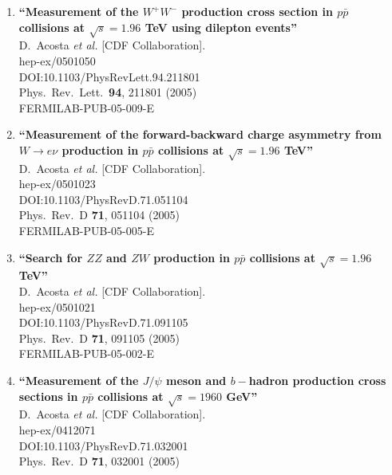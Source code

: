 \documentclass{article}
\begin{document}
\begin{enumerate}
\item%
{\bf ``Measurement of the $W^+ W^-$ production cross section in $p\bar{p}$ collisions at $\sqrt{s} = 1.96$ TeV using dilepton events''}
  \\{}D.~Acosta {\it et al.} [CDF Collaboration].
  \\{}hep-ex/0501050
  \\{}DOI:10.1103/PhysRevLett.94.211801
  \\{}Phys.\ Rev.\ Lett.\  {\bf 94}, 211801 (2005)
  \\{}FERMILAB-PUB-05-009-E
\item%
{\bf ``Measurement of the forward-backward charge asymmetry from $W \to e \nu$ production in $p\bar{p}$ collisions at $\sqrt{s} = 1.96$ TeV''}
  \\{}D.~Acosta {\it et al.} [CDF Collaboration].
  \\{}hep-ex/0501023
  \\{}DOI:10.1103/PhysRevD.71.051104
  \\{}Phys.\ Rev.\ D {\bf 71}, 051104 (2005)
  \\{}FERMILAB-PUB-05-005-E
\item%
{\bf ``Search for $Z Z$ and $Z W$ production in $p\bar{p}$ collisions at $\sqrt{s} = 1.96$ TeV''}
  \\{}D.~Acosta {\it et al.} [CDF Collaboration].
  \\{}hep-ex/0501021
  \\{}DOI:10.1103/PhysRevD.71.091105
  \\{}Phys.\ Rev.\ D {\bf 71}, 091105 (2005)
  \\{}FERMILAB-PUB-05-002-E
\item%
{\bf ``Measurement of the $J/\psi$ meson and $b-$hadron production cross sections in $p\bar{p}$ collisions at $\sqrt{s} = 1960$ GeV''}
  \\{}D.~Acosta {\it et al.} [CDF Collaboration].
  \\{}hep-ex/0412071
  \\{}DOI:10.1103/PhysRevD.71.032001
  \\{}Phys.\ Rev.\ D {\bf 71}, 032001 (2005)

\end{enumerate}
\end{document}
